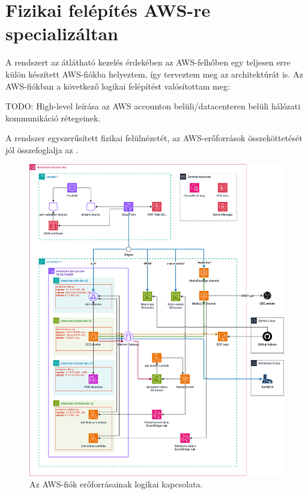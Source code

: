 \section{Fizikai felépítés AWS-re specializáltan}

A rendszert az átlátható kezelés érdekében az AWS-felhőben egy teljesen erre külön készített AWS-fiókba helyeztem, így terveztem meg az architektúrát is. Az AWS-fiókban a következő logikai felépítést valósítottam meg:

TODO: High-level leírása az AWS accounton belüli/datacenteren belüli hálózati kommunikáció rétegeinek.

A rendszer egyszerűsített fizikai felülnézetét, az AWS-erőforrások összeköttetését jól összefoglalja az .

\begin{figure}[ht]
	\centering
	\includegraphics[width=155mm, keepaspectratio]{figures/dipterv_architect.png}
	\caption{Az AWS-fiók erőforrásainak logikai kapcsolata.}
	\label{fig:architect}
\end{figure}

